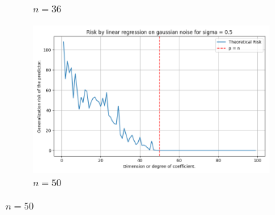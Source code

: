\documentclass[10pt,oneside,oldfontcommands,dvipsnames,article]{memoir}
\begin{document}
\begin{figure}[htb]
\begin{subfigure}[b]{\imgwidth}
    \caption{$n=36$}\label{fig:1c21}
  \end{subfigure}%
  \hfill
  \begin{subfigure}[b]{\imgwidth}
    \includegraphics[width=\linewidth]{img/descent_devel_t4.png}
    \caption{$n=50$}\label{fig:1d21}
  \end{subfigure}

  \medskip


\end{figure}
\end{document}
